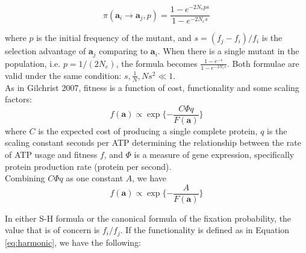 \documentclass[13pt]{article}
\begin{document}
\begin{equation}
\pi(\mathbf{a}_i \rightarrow \mathbf{a}_j,p) = \frac{1-e^{-2N_e ps}}{1-e^{-2N_es}}
\label{eq:fixcanonical}
\end{equation}

where $p$ is the initial frequency of the mutant, and $s=(f_j-f_i)/f_i$ is the selection advantage of $\mathbf{a}_j$ comparing to $\mathbf{a}_i$.
When there is a single mutant in the population, i.e. $p=1/(2N_e)$, the formula becomes
$\frac{1-e^{-s}}{1-e^{-2N_es}}$. Both formulae are valid under the same condition: $s, \frac{1}{N}, Ns^2 \ll 1$.\\


 
As in Gilchrist 2007, fitness is a function of cost, functionality and some scaling factors:
\[f(\mathbf{a}) \propto \exp\{-\frac{C\Phi q}{F(\mathbf{a})}\}\]
where $C$ is the expected cost of producing a single complete protein, $q$ is the scaling constant seconds per ATP determining the relationship between the rate of ATP usage and fitness $f$, and $\Phi$ is a measure of gene expression, specifically protein production rate (protein per second). \\

Combining $C\Phi q$ as one constant $A$, we have
\[ f(\mathbf{a}) \propto \exp\{-\frac{A}{F(\mathbf{a})}\} \]

In either S-H formula or the canonical formula of the fixation probability, the value that is of concern is $f_i/f_j$.
If the functionality is defined as in Equation \ref{eq:harmonic}, we have the following:
\end{document}
